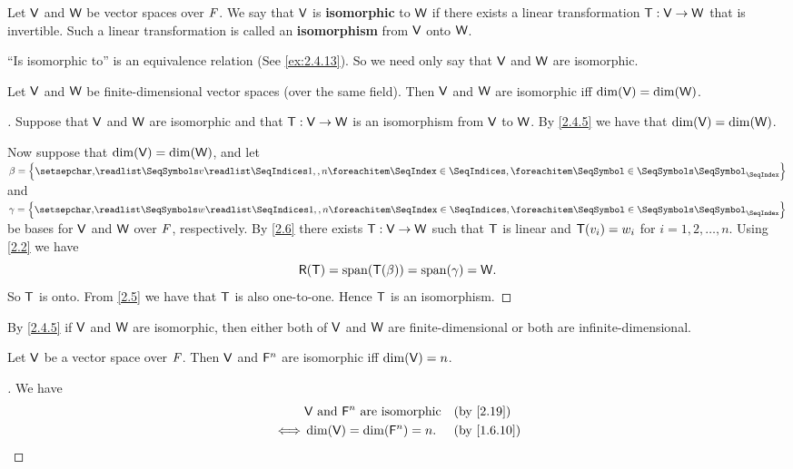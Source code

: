 \begin{defn}\label{2.4.8}
  Let \(\mathsf{V}\) and \(\mathsf{W}\) be vector spaces over \(\mathit{F}\).
  We say that \(\mathsf{V}\) is \textbf{isomorphic} to \(\mathsf{W}\) if there exists a linear transformation \(\mathsf{T} : \mathsf{V} \to \mathsf{W}\) that is invertible.
  Such a linear transformation is called an \textbf{isomorphism} from \(\mathsf{V}\) onto \(\mathsf{W}\).
\end{defn}

\begin{note}
  ``Is isomorphic to'' is an equivalence relation (See \cref{ex:2.4.13}).
  So we need only say that \(\mathsf{V}\) and \(\mathsf{W}\) are isomorphic.
\end{note}

\begin{thm}\label{2.19}
  Let \(\mathsf{V}\) and \(\mathsf{W}\) be finite-dimensional vector spaces (over the same field).
  Then \(\mathsf{V}\) and \(\mathsf{W}\) are isomorphic iff \(\dim(\mathsf{V}) = \dim(\mathsf{W})\).
\end{thm}

\begin{proof}[]
  Suppose that \(\mathsf{V}\) and \(\mathsf{W}\) are isomorphic and that \(\mathsf{T} : \mathsf{V} \to \mathsf{W}\) is an isomorphism from \(\mathsf{V}\) to \(\mathsf{W}\).
  By \cref{2.4.5} we have that \(\dim(\mathsf{V}) = \dim(\mathsf{W})\).

  Now suppose that \(\dim(\mathsf{V}) = \dim(\mathsf{W})\), and let \(\beta = \set{\seq{v}{1,,n}}\) and \(\gamma = \set{\seq{w}{1,,n}}\) be bases for \(\mathsf{V}\) and \(\mathsf{W}\) over \(\mathit{F}\), respectively.
  By \cref{2.6} there exists \(\mathsf{T} : \mathsf{V} \to \mathsf{W}\) such that \(\mathsf{T}\) is linear and \(\mathsf{T}(v_i) = w_i\) for \(i = 1, 2, \dots, n\).
  Using \cref{2.2} we have
  \[
    \rg{\T} = \spn{\T(\beta)} = \spn{\gamma} = \W.
  \]
  So \(\mathsf{T}\) is onto.
  From \cref{2.5} we have that \(\mathsf{T}\) is also one-to-one.
  Hence \(\mathsf{T}\) is an isomorphism.
\end{proof}

\begin{note}
  By \cref{2.4.5} if \(\mathsf{V}\) and \(\mathsf{W}\) are isomorphic, then either both of \(\mathsf{V}\) and \(\mathsf{W}\) are finite-dimensional or both are infinite-dimensional.
\end{note}

\begin{cor}\label{2.4.9}
  Let \(\mathsf{V}\) be a vector space over \(\mathit{F}\).
  Then \(\mathsf{V}\) and \(\mathsf{F}^n\) are isomorphic iff \(\dim(\mathsf{V}) = n\).
\end{cor}

\begin{proof}[]
  We have
  \begin{align*}
         & \V \text{ and } \vs{F}^n \text{ are isomorphic} &  & \text{(by \cref{2.19})}   \\
    \iff & \dim(\V) = \dim(\vs{F}^n) = n.                  &  & \text{(by \cref{1.6.10})}
  \end{align*}
\end{proof}

